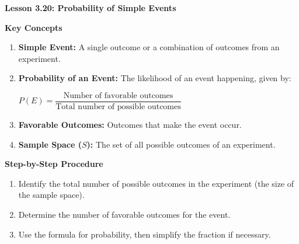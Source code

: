 \begin{center}
\textbf{Lesson 3.20: Probability of Simple Events}
\end{center}

\vspace*{-1.5ex}

\noindent\textbf{Key Concepts}

\begin{enumerate}[label=\color{blue}\arabic*.]
    \item \textbf{Simple Event:} A single outcome or a combination of outcomes from an experiment.
    \item \textbf{Probability of an Event:} The likelihood of an event happening, given by:
      
{\centering $ 
    P(E) = \dfrac{\text{Number of favorable outcomes}}{\text{Total number of possible outcomes}}
 $\par}
    \item \textbf{Favorable Outcomes:} Outcomes that make the event occur.
    \item \textbf{Sample Space (\(S\)):} The set of all possible outcomes of an experiment.
\end{enumerate}

\noindent\textbf{Step-by-Step Procedure}

\begin{enumerate}
    \item Identify the total number of possible outcomes in the experiment (the size of the sample space).
    \item Determine the number of favorable outcomes for the event.
    \item Use the formula for probability, then simplify the fraction if necessary.
\end{enumerate}

